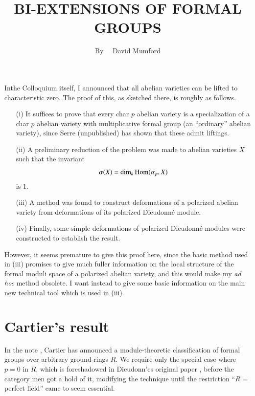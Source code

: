 \title{BI-EXTENSIONS OF FORMAL GROUPS}

\author{By~~ David Mumford}
\date{}

\maketitle

\setcounter{pageoriginal}{306}
In\pageoriginale the Colloquium itself, I announced that all abelian varieties can be lifted to characteristic zero. The proof of this, as sketched there, is roughly as follows.
\begin{itemize}
\item[(i)] It suffices to prove that every char $p$ abelian variety is a specialization of a char $p$ abelian variety with multiplicative formal group (an ``ordinary'' abelian variety), since Serre (unpublished) has shown that these admit liftings.

\item[(ii)] A preliminary reduction of the problem was made to abelian varieties $X$ such that the invariant
$$
\alpha(X)=\dim_{k}\operatorname{\mathrm{Hom}} (\alpha_{p},X)
$$
is $1$.

\item[(iii)] A method was found to construct deformations of a polarized abelian variety from deformations of its polarized Dieudonn\'e module.

\item[(iv)] Finally, some simple deformations of polarized Dieudonn\'e modules were constructed to establish the result.
\end{itemize}

However, it seems premature to give this proof here, since the basic method used in (iii) promises to give much fuller information on the local structure of the formal moduli space of a polarized abelian variety, and this would make my {\em ad hoc} method obsolete. I want instead to give some basic information on the main new technical tool which is used in (iii).

\section{Cartier's result}\label{art15-sec1}

In the note \cite{art15-key1}, Cartier has announced a module-theoretic classification of formal groups over arbitrary ground-rings $R$. We require only the special case where $p=0$ in $R$, which is foreshadowed in Dieudonn'es original paper \cite{art15-key2}, before the category men got a hold of it, modifying the technique until the restriction ``$R$ = perfect field'' came to seem essential.

